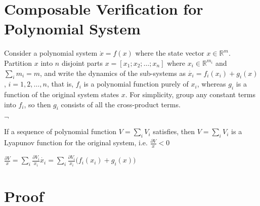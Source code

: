 \documentclass{article}
\begin{document}
\section{Composable Verification for Polynomial System} %
\label{sec:composable_verification_for_polynomial_system}
Consider a polynomial system $\dot x=f(x)$ where the state vector $x\in \mathbb{R}^m$. Partition $x$ into $n$ disjoint parts $x=[x_1;x_2;\dots;x_n]$ where $x_i \in \mathbb{R}^{m_i}$ and $\sum\limits_{i}{m_i}=m$, and write the dynamics of the sub-systems as $\dot{x_i}=f_i(x_i)+g_i(x)$, $i=1,2,\dots,n$, that is, $f_i$ is a polynomial function purely of $x_i$, whereas $g_i$ is a function of the original system states $x$. For simplicity, group any constant terms into $f_i$, so then $g_i$ consists of all the cross-product terms.

$\lnot$


If a sequence of polynomial function $V=\sum\limits_{i}{V_i}$ satisfies, then $V=\sum\limits_{i}{V_i}$ is a Lyapunov function for the original system, i.e. $\frac{\partial{V}}{x}<0$

$\frac{\partial{V}}{x}=\sum\limits_{i}{\frac{\partial{V_i}}{x_i}\dot{x_i}}=\sum\limits_{i}{\frac{\partial{V_i}}{x_i}(f_i(x_i)+g_i(x)})$

\section{Proof} %
\label{sec:proof}

\end{document}
